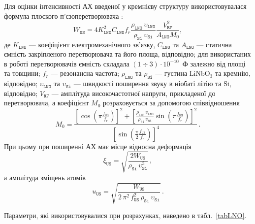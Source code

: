 Для оцінки інтенсивності АХ введеної у кремнієву структуру використовувалася формула плоского п’єзоперетворювача \cite{WusBook}:
 \begin{equation}
 \label{eqWus}
 W_\mathtt{US}=4K_\mathtt{LNO}^2C_\mathtt{LNO}f_r\frac{\rho_\mathtt{LNO}\,\upsilon_\mathtt{LNO}}{\rho_\mathtt{Si}\,\upsilon_\mathtt{Si}}\frac{V_\mathtt{RF}^2}{A_\mathtt{LNO}M_0},
 \end{equation}
де
$K_\mathtt{LNO}$ --- коефіцієнт електромеханічного зв'язку,
$C_\mathtt{LNO}$ та $A_\mathtt{LNO}$ --- статична ємність закріпленого перетворювача та його площа, відповідно;
для використаних в роботі перетворювачів ємність складала $(1\div3)\cdot10^{-10}$~Ф залежно від площі та товщини;
$f_r$ --- резонансна частота;
$\rho_\mathtt{LNO}$ та $\rho_\mathtt{Si}$ --- густина LiNbO$_3$ та кремнію, відповідно;
$\upsilon_\mathtt{LNO}$ та $\upsilon_\mathtt{Si}$ --- швидкості поширення звуку в ніобаті літію та Si, відповідно;
$V_\mathtt{RF}$ --- амплітуда високочастотної напруги, прикладеної до перетворювача,
а коефіцієнт $M_0$ розраховується за допомогою співвідношення
 \begin{equation}
 \label{eqM0}
 M_0=\frac{\left[\cos\left(\pi\frac{f_\mathtt{US}}{f_r}\right)\right]^2+\left[\frac{\rho_\mathtt{LNO}\,\upsilon_\mathtt{LNO}}{\rho_\mathtt{Si}\,\upsilon_\mathtt{Si}}\sin\left(\pi\frac{f_\mathtt{US}}{f_r}\right)\right]^2}
 {\left[\sin\left(\frac{\pi}{2}\frac{f_\mathtt{US}}{f_r}\right)\right]^4}\,.
 \end{equation}
При цьому при поширенні АХ має місце відносна деформація
 \begin{equation}
 \label{eqDefUS}
 \xi_{\mathtt{US}}=\sqrt{\frac{2W_\mathtt{US}}{\rho_\mathtt{Si}\,\upsilon_\mathtt{Si}^3}}\,,
 \end{equation}
а амплітуда зміщень атомів
 \begin{equation}
 \label{eqAmpUS}
 u_{\mathtt{US}}=\sqrt{\frac{W_\mathtt{US}}{2\,\pi^2\,f_\mathtt{US}^2\,\rho_\mathtt{Si}\,\upsilon_\mathtt{Si}}}\,.
 \end{equation}

Параметри, які використовувалися при розрахунках, наведено в табл.~\ref{tabLNO}.


